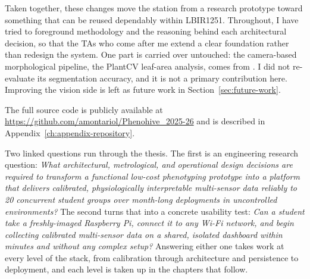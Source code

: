 Taken together, these changes move the station from a research prototype toward something that can be reused dependably within LBIR1251. Throughout, I have tried to foreground methodology and the reasoning behind each architectural decision, so that the TAs who come after me extend a clear foundation rather than redesign the system. One part is carried over untouched: the camera-based morphological pipeline, the PlantCV leaf-area analysis, comes from \textcite{colinet2025}. I did not re-evaluate its segmentation accuracy, and it is not a primary contribution here. Improving the vision side is left as future work in Section~\ref{sec:future-work}.

The full source code is publicly available at \url{https://github.com/amontariol/Phenohive_2025-26} and is described in Appendix~\ref{ch:appendix-repository}.

Two linked questions run through the thesis. The first is an engineering research question: \emph{What architectural, metrological, and operational design decisions are required to transform a functional low-cost phenotyping prototype into a platform that delivers calibrated, physiologically interpretable multi-sensor data reliably to 20 concurrent student groups over month-long deployments in uncontrolled environments?} The second turns that into a concrete usability test: \emph{Can a student take a freshly-imaged Raspberry Pi, connect it to any Wi-Fi network, and begin collecting calibrated multi-sensor data on a shared, isolated dashboard within minutes and without any complex setup?} Answering either one takes work at every level of the stack, from calibration through architecture and persistence to deployment, and each level is taken up in the chapters that follow.

\endgroup



